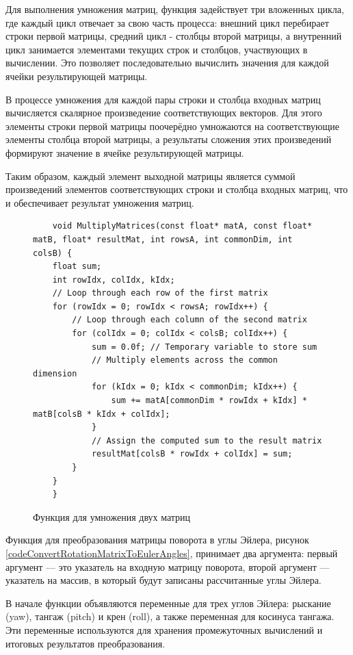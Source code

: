 Для выполнения умножения матриц, функция задействует три вложенных цикла, где каждый цикл отвечает за свою часть процесса: внешний цикл перебирает строки первой матрицы, средний цикл - столбцы второй матрицы, а внутренний цикл занимается элементами текущих строк и столбцов, участвующих в вычислении. Это позволяет последовательно вычислить значения для каждой ячейки результирующей матрицы.

В процессе умножения для каждой пары строки и столбца входных матриц вычисляется скалярное произведение соответствующих векторов. Для этого элементы строки первой матрицы поочерёдно умножаются на соответствующие элементы столбца второй матрицы, а результаты сложения этих произведений формируют значение в ячейке результирующей матрицы.

Таким образом, каждый элемент выходной матрицы является суммой произведений элементов соответствующих строки и столбца входных матриц, что и обеспечивает результат умножения матриц.

\begin{figure}[H]
	\centering
	\begin{verbatim}
    void MultiplyMatrices(const float* matA, const float* matB, float* resultMat, int rowsA, int commonDim, int colsB) {
    float sum;
    int rowIdx, colIdx, kIdx;
    // Loop through each row of the first matrix
    for (rowIdx = 0; rowIdx < rowsA; rowIdx++) {
        // Loop through each column of the second matrix
        for (colIdx = 0; colIdx < colsB; colIdx++) {
            sum = 0.0f; // Temporary variable to store sum
            // Multiply elements across the common dimension
            for (kIdx = 0; kIdx < commonDim; kIdx++) {
                sum += matA[commonDim * rowIdx + kIdx] * matB[colsB * kIdx + colIdx];
            }
            // Assign the computed sum to the result matrix
            resultMat[colsB * rowIdx + colIdx] = sum;
        }
    }
    }
	\end{verbatim}
	\caption{Функция для умножения двух матриц}\label{codematrix}
\end{figure}

Функция для преобразования матрицы поворота в углы Эйлера, рисунок \ref{codeConvertRotationMatrixToEulerAngles}, принимает два аргумента: первый аргумент — это указатель на входную матрицу поворота, второй аргумент — указатель на массив, в который будут записаны рассчитанные углы Эйлера.

В начале функции объявляются переменные для трех углов Эйлера: рыскание (yaw), тангаж (pitch) и крен (roll), а также переменная для косинуса тангажа. Эти переменные используются для хранения промежуточных вычислений и итоговых результатов преобразования.

